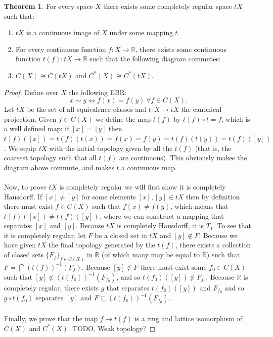 \documentclass[a4paper]{book}
\theoremstyle{definition}
\newtheorem{theorem}{Theorem}[section]
\theoremstyle{ejemplo}
\theoremstyle{demostracion}
\newcommand{\reales}{\mathbb{R}}
\begin{document}
\begin{theorem}
	For every space $X$ there exists some completely regular space $tX$ such that:
	\begin{enumerate}
		\item
		$tX$ is a continuous image of $X$ under some mapping $t$.
		
		\item
		For every continuous function $f: X \rightarrow \reales$, there exists some continuous function $t(f): tX \rightarrow \reales$ such that the following diagram commutes:	

		\begin{center}
		\end{center}	
			
		\item
		$C(X) \cong C(tX)$ and $C^*(X) \cong C^*(tX)$.
	\end{enumerate}
\end{theorem}
\begin{proof}
	Define over $X$ the following EBR:
	\begin{equation*}
		x \sim y \Leftrightarrow f(x) = f(y)\ \forall f \in C(X).
	\end{equation*}
	Let $tX$ be the set of all equivalence classes and $t: X \rightarrow tX$ the canonical projection. Given $f \in C(X)$ we define the map $t(f)$ by $t(f) \circ t = f$, which is a well defined map: if $[x] = [y]$ then $t(f)([x]) = t(f)(t(x)) = f(x) = f(y) = t(f)(t(y)) = t(f)([y])$. We equip $tX$ with the initial topology given by all the $t(f)$ (that is, the coarsest topology such that all $t(f)$ are continuous). This obviously makes the diagram above commute, and makes $t$ a continuous map. \\ \\ 
	Now, to prove $tX$ is completely regular we will first show it is completely Hausdorff. If $[x] \not = [y]$ for some elements $[x], [y] \in tX$ then by definition there must exist $f \in C(X)$ such that $f(x) \neq f(y)$, which means that $t(f)([x]) \neq t(f)([y])$, where we can construct a mapping that separates $[x]$ and $[y]$. Because $tX$ is completely Hausdorff, it is $T_1$. To see that it is completely regular, let $F$ be a closed set in $tX$ and $[y] \not \in F$. Because we have given $tX$ the final topology generated by the $t(f)$, there exists a collection of closed sets $\{F_f\}_{f \in C(X)}$ in $\reales$ (of which many may be equal to $\reales$) such that $F = \bigcap (t(f))^{-1} (F_f)$. Because $[y] \not \in F$ there must exist some $f_0 \in C(X)$ such that $[y] \not \in (t(f_0))^{-1} (F_{f_0})$, and so $t(f_0)([y]) \not \in F_{f_0}$. Because $\reales$ is completely regular, there exists $g$ that separates $t(f_0)([y])$ and $F_{f_0}$ and so $g \circ t(f_0)$ separates $[y]$ and $F \subseteq (t(f_0))^{-1}(F_{f_0})$.\\ \\ 
	Finally, we prove that the map $f \rightarrow t(f)$ is a ring and lattice isomorphism of $C(X)$ and $C^*(X)$. TODO, Weak topology?
\end{proof}
\end{document}
